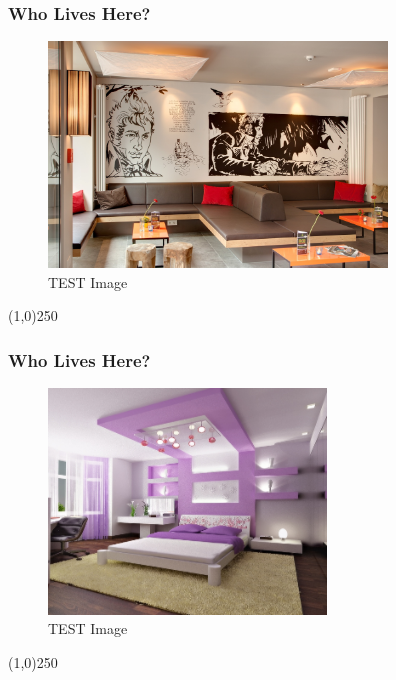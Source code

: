 \begin{frame}
\frametitle{Who Lives Here?}
\begin{figure}
	\centering
		\includegraphics[height=6cm]{img/H.jpg}
	\caption{TEST Image}
	\label{fig:lightingtypes}
\end{figure}
\end{frame}
\begin{center}\line(1,0){250}\end{center}




\begin{frame}
\frametitle{Who Lives Here?}
\begin{figure}
	\centering
		\includegraphics[height=6cm]{img/H.png}
	\caption{TEST Image}
	\label{fig:lightingtypes}
\end{figure}
\end{frame}
\begin{center}\line(1,0){250}\end{center}



